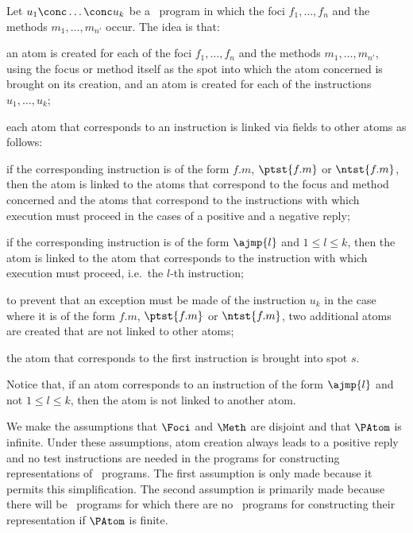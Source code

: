 \documentclass[fleqn]{llncs}
\begin{document}
Let $u_1 \conc \ldots \conc u_k$ be a \PGLD\ program in which the foci
$f_1,\ldots,f_n$ and the methods $m_1,\ldots,m_{n'}$ occur.
The idea is that:
\begin{iteml}
\item
an atom is created for each of the foci $f_1,\ldots,f_n$ and the methods
$m_1,\ldots,m_{n'}$, using the focus or method itself as the spot into
which the atom concerned is brought on its creation, and an atom is
created for each of the instructions $u_1,\ldots,u_k$;
\item
each atom that corresponds to an instruction is linked via fields to
other atoms as follows:
\begin{iteml}
\item
if the corresponding instruction is of the form $f.m$, $\ptst{f.m}$ or
$\ntst{f.m}$, then the atom is linked to the atoms that correspond to
the focus and method concerned and the atoms that correspond to the
instructions with which execution must proceed in the cases of a positive
and a negative reply;
\item
if the corresponding instruction is of the form $\ajmp{l}$ and
$1 \leq l \leq k$, then the atom is linked to the atom that corresponds
to the instruction with which execution must proceed, i.e.\ the $l$-th
instruction;
\end{iteml}
\item
to prevent that an exception must be made of the instruction $u_k$ in
the case where it is of the form $f.m$, $\ptst{f.m}$ or $\ntst{f.m}$,
two additional atoms are created that are not linked to other atoms;
\item
the atom that corresponds to the first instruction is brought into spot
$s$.
\end{iteml}
Notice that, if an atom corresponds to an instruction of the form
$\ajmp{l}$ and not $1 \leq l \leq k$, then the atom is not linked to
another atom.

We make the assumptions that $\Foci$ and $\Meth$ are disjoint and that
$\PAtom$ is infinite.
Under these assumptions, atom creation always leads to a positive reply
and no test instructions are needed in the programs for constructing
representations of \PGLD\ programs.
The first assumption is only made because it permits this
simplification.
The second assumption is primarily made because there will be \PGLD\
programs for which there are no \PGA\ programs for constructing their
representation if $\PAtom$ is finite.
\end{document}
